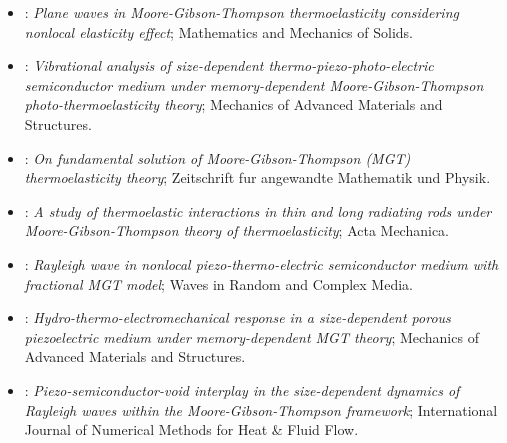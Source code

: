 \begin{itemize}
\item \citet{Das2023}: \emph{Plane waves in Moore-Gibson-Thompson thermoelasticity considering nonlocal elasticity effect}; Mathematics and Mechanics of Solids.
\item \citet{Gupta2023c}: \emph{Vibrational analysis of size-dependent thermo-piezo-photo-electric semiconductor medium under memory-dependent Moore-Gibson-Thompson photo-thermoelasticity theory}; Mechanics of Advanced Materials and Structures.
\item \citet{Singh2023}: \emph{On fundamental solution of Moore-Gibson-Thompson (MGT) thermoelasticity theory}; Zeitschrift fur angewandte Mathematik und Physik.
\item \citet{Srivastava2023}: \emph{A study of thermoelastic interactions in thin and long radiating rods under Moore-Gibson-Thompson theory of thermoelasticity}; Acta Mechanica.
\item \citet{Gupta2024}: \emph{Rayleigh wave in nonlocal piezo-thermo-electric semiconductor medium with fractional MGT model}; Waves in Random and Complex Media.
\item \citet{Das2025a}: \emph{Hydro-thermo-electromechanical response in a size-dependent porous piezoelectric medium under memory-dependent MGT theory}; Mechanics of Advanced Materials and Structures.
\item \citet{Gupta2025a}: \emph{Piezo-semiconductor-void interplay in the size-dependent dynamics of Rayleigh waves within the Moore-Gibson-Thompson framework}; International Journal of Numerical Methods for Heat \& Fluid Flow.
\end{itemize}
